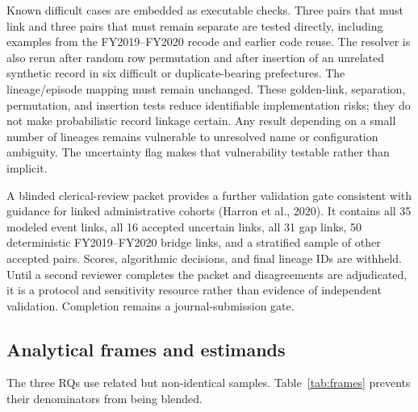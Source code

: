 \documentclass[11pt,letterpaper]{article}
\begin{document}
Known difficult cases are embedded as executable checks. Three pairs that must
link and three pairs that must remain separate are tested directly, including
examples from the FY2019--FY2020 recode and earlier code reuse. The resolver is
also rerun after random row permutation and after insertion of an unrelated
synthetic record in six difficult or duplicate-bearing prefectures. The
lineage/episode mapping must remain unchanged. These golden-link, separation,
permutation, and insertion tests reduce identifiable implementation risks; they
do not make probabilistic record linkage certain. Any result depending on a
small number of lineages remains vulnerable to unresolved name or configuration
ambiguity. The uncertainty flag makes that vulnerability testable rather than
implicit.

A blinded clerical-review packet provides a further validation gate consistent
with guidance for linked administrative cohorts (Harron et al., 2020). It
contains all 35 modeled event links, all 16 accepted uncertain links, all 31 gap
links, 50 deterministic FY2019--FY2020 bridge links, and a stratified sample of
other accepted pairs. Scores, algorithmic decisions, and final lineage IDs are
withheld. Until a second reviewer completes the packet and disagreements are
adjudicated, it is a protocol and sensitivity resource rather than evidence of
independent validation. Completion remains a journal-submission gate.

\subsection{Analytical frames and estimands}

The three RQs use related but non-identical samples. Table~\ref{tab:frames}
prevents their denominators from being blended.
\end{document}
